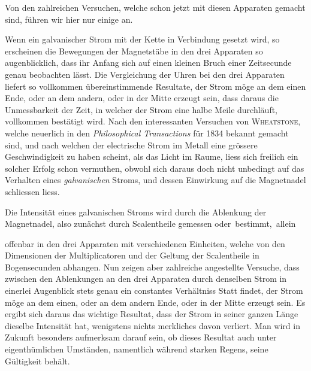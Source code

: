 Von den zahlreichen Versuchen, welche schon jetzt mit diesen Apparaten gemacht sind, führen wir hier nur einige an.

Wenn ein galvanischer Strom mit der Kette in Verbindung gesetzt wird, so erscheinen die Bewegungen der Magnetstäbe in den drei Apparaten so augenblicklich, dass ihr Anfang sich auf einen kleinen Bruch einer Zeitsecunde genau beobachten lässt. Die Vergleichung der Uhren bei den drei Apparaten liefert so vollkommen übereinstimmende Resultate, der Strom möge an dem einen Ende, oder an dem andern, oder in der Mitte erzeugt sein, dass daraus die Unmessbarkeit der Zeit, in welcher der Strom eine halbe Meile durchläuft, vollkommen bestätigt wird. Nach den interessanten Versuchen von \textsc{Wheatstone}, welche neuerlich in den \textit{Philosophical Transactions} für 1834 bekannt gemacht sind, und nach welchen der electrische Strom im Metall eine grössere Geschwindigkeit zu haben scheint, als das Licht im Raume, liess sich freilich ein solcher Erfolg schon vermuthen, obwohl sich daraus doch nicht unbedingt auf das Verhalten eines \textit{galvanischen} Stroms, und dessen Einwirkung auf die Magnetnadel schliessen liess.

Die Intensität eines galvanischen Stroms wird durch die Ablenkung der Magnetnadel, also zunächst durch Scalentheile gemessen oder~bestimmt,~allein
\par\GaussVSourceGathering{67\textsuperscript{*}}
\par\clearpage
{}
\noindent offenbar in den drei Apparaten mit verschiedenen Einheiten, welche von den Dimensionen der Multiplicatoren und der Geltung der Scalentheile in Bogensecunden abhangen. Nun zeigen aber zahlreiche angestellte Versuche, dass zwischen den Ablenkungen an den drei Apparaten durch denselben Strom in einerlei Augenblick stets genau ein constantes Verhältniss Statt findet, der Strom möge an dem einen, oder an dem andern Ende, oder in der Mitte erzeugt sein. Es ergibt sich daraus das wichtige Resultat, dass der Strom in seiner ganzen Länge dieselbe Intensität hat, wenigstens nichts merkliches davon verliert. Man wird in Zukunft besonders aufmerksam darauf sein, ob dieses Resultat auch unter eigenthümlichen Umständen, namentlich während starken Regens, seine Gültigkeit behält.

